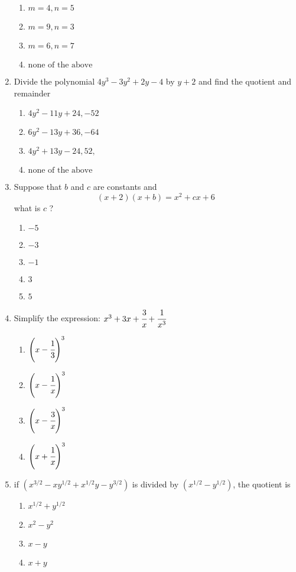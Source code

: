 \begin{multicols}{2}
\begin{enumerate}[label={\arabic*.}]
\begin{enumerate}[label={\Alph*.}]
	\item \(m = 4, n = 5\)
	\item \(m = 9, n =3\)
	\item \(m = 6, n = 7\)
	\item \( \text{none of the above}\)
	\end{enumerate}
\item Divide the polynomial $4y^3 - 3y^2 + 2y -4 $ by $y + 2$ and find the quotient and remainder 
	\begin{enumerate}[label={\Alph*.}]
	\item \(4y^2 - 11y + 24, -52\)
	\item \(6y^2 - 13y + 36 , -64\)
	\item \(4y^2 + 13y - 24, 52, \)
	\item \(\text{none of the above}\)
	\end{enumerate}
\item Suppose that $b$ and $c$ are constants and $$(x+2)(x+b) = x^2 + cx + 6$$ what is $c$ ?
	\begin{enumerate}[label={\Alph*.}]
	\item \(-5\)
	\item \(-3\)
	\item \(-1\)
	\item \(3\)
	\item \(5\)
	\end{enumerate}
\item Simplify the expression: $x^3 + 3x + \cfrac{3}{x} + \cfrac{1}{x^3}$
\begin{multicols}{2}
	\begin{enumerate}[label={\Alph*.}]
	\item \(\left(x - \cfrac{1}{3}\right)^3\)
	\item \(\left(x - \cfrac{1}{x}\right)^3\)
	\item \(\left(x - \cfrac{3}{x}\right)^3\)
	\item \(\left(x + \cfrac{1}{x}\right)^3\)
	\end{enumerate}
\end{multicols}
\item if $(x^{3/2} - xy^{1/2} + x^{1/2}y - y^{3/2})$ is divided by $(x^{1/2} - y^{1/2})$, the quotient is 
\begin{enumerate}[label={\Alph*.}]
	\item \(x^{1/2} + y^{1/2}\)
	\item \(x^2 - y^2\)
	\item \(x-y\)
	\item \(x+y\)
	\end{enumerate}

\end{enumerate}
\end{multicols}

